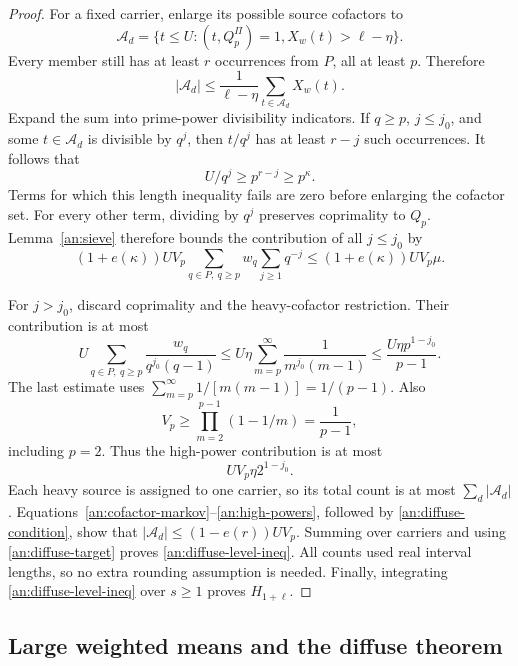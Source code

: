 \begin{proof}
For a fixed carrier, enlarge its possible source cofactors to
\[
 \mathcal A_d=\{t\le U:(t,Q_p^{\Pi})=1, X_w(t)>\ell-\eta\}.
\]
Every member still has at least \(r\) occurrences from \(P\), all at
least \(p\). Therefore
\begin{equation}
 |\mathcal A_d|
 \le\frac1{\ell-\eta}\sum_{t\in\mathcal A_d}X_w(t).
 \label{an:cofactor-markov}
\end{equation}
Expand the sum into prime-power divisibility indicators. If \(q\ge p\),
\(j\le j_0\), and some \(t\in\mathcal A_d\) is divisible by \(q^j\),
then \(t/q^j\) has at least \(r-j\) such occurrences. It follows that
\[
 U/q^j\ge p^{r-j}\ge p^{\kappa}.
\]
Terms for which this length inequality fails are zero before enlarging
the cofactor set. For every other term, dividing by \(q^j\) preserves
coprimality to \(Q_p\). Lemma~\ref{an:sieve} therefore bounds the
contribution of all \(j\le j_0\) by
\begin{equation}
 (1+e(\kappa))UV_p
   \sum_{q\in P,\ q\ge p}w_q\sum_{j\ge1}q^{-j}
 \le(1+e(\kappa))UV_p\mu.
 \label{an:low-powers}
\end{equation}

For \(j>j_0\), discard coprimality and the heavy-cofactor restriction.
Their contribution is at most
\[
 U\sum_{q\in P,\ q\ge p}\frac{w_q}{q^{j_0}(q-1)}
 \le U\eta\sum_{m=p}^{\infty}\frac1{m^{j_0}(m-1)}
 \le\frac{U\eta p^{1-j_0}}{p-1}.
\]
The last estimate uses
\(\sum_{m=p}^{\infty}1/[m(m-1)]=1/(p-1)\). Also
\[
 V_p\ge\prod_{m=2}^{p-1}(1-1/m)=\frac1{p-1},
\]
including \(p=2\). Thus the high-power contribution is at most
\begin{equation}
 UV_p\eta2^{1-j_0}.
 \label{an:high-powers}
\end{equation}
Each heavy source is assigned to one carrier, so its total count is at
most \(\sum_d|\mathcal A_d|\). Equations~\eqref{an:cofactor-markov}--\eqref{an:high-powers}, followed
by \eqref{an:diffuse-condition}, show that
\(|\mathcal A_d|\le(1-e(r))UV_p\). Summing over carriers and using
\eqref{an:diffuse-target} proves \eqref{an:diffuse-level-ineq}.
All counts used real interval lengths, so no extra rounding assumption
is needed. Finally, integrating \eqref{an:diffuse-level-ineq} over
\(s\ge1\) proves \(H_{1+\ell}\).
\end{proof}

\subsection{Large weighted means and the diffuse theorem}

